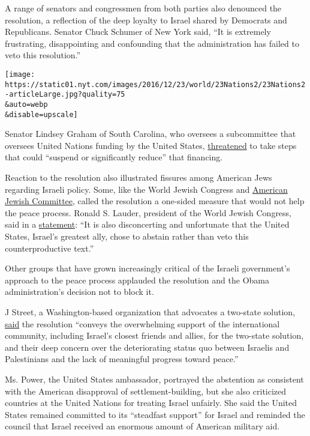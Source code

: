A range of senators and congressmen from both parties also denounced the
resolution, a reflection of the deep loyalty to Israel shared by
Democrats and Republicans. Senator Chuck Schumer of New York said, ``It
is extremely frustrating, disappointing and confounding that the
administration has failed to veto this resolution.''

\texttt{[image: https://static01.nyt.com/images/2016/12/23/world/23Nations2/23Nations2-articleLarge.jpg?quality=75\\\&auto=webp\\\&disable=upscale]}

Senator Lindsey Graham of South Carolina, who oversees a subcommittee
that oversees United Nations funding by the United States,
\href{http://www.lgraham.senate.gov/public/index.cfm/press-releases?ID=3D8C552F-EE98-4A25-942E-5B389F2695F2}{threatened}
to take steps that could ``suspend or significantly reduce'' that
financing.

Reaction to the resolution also illustrated fissures among American Jews
regarding Israeli policy. Some, like the World Jewish Congress and
\href{http://www.ajc.org/site/apps/nlnet/content3.aspx?c=7oJILSPwFfJSG\&b=9302337\&ct=14976765\&notoc=1}{American
Jewish Committee}, called the resolution a one-sided measure that would
not help the peace process. Ronald S. Lauder, president of the World
Jewish Congress, said in a
\href{http://www.worldjewishcongress.org/en/news/wjc-president-lauder-dismayed-by-un-security-council-resolution-on-israeli-settlements-calls-us-choice-not-to-veto-disconcerting-an-unfortunate-12-5-2016}{statement}:
``It is also disconcerting and unfortunate that the United States,
Israel's greatest ally, chose to abstain rather than veto this
counterproductive text.''

Other groups that have grown increasingly critical of the Israeli
government's approach to the peace process applauded the resolution and
the Obama administration's decision not to block it.

J Street, a Washington-based organization that advocates a two-state
solution,
\href{http://jstreet.org/press-releases/j-street-welcomes-us-abstention-unsc-resolution/\#.WF2d7X35PZw}{said}
the resolution ``conveys the overwhelming support of the international
community, including Israel's closest friends and allies, for the
two-state solution, and their deep concern over the deteriorating status
quo between Israelis and Palestinians and the lack of meaningful
progress toward peace.''

Ms. Power, the United States ambassador, portrayed the abstention as
consistent with the American disapproval of settlement-building, but she
also criticized countries at the United Nations for treating Israel
unfairly. She said the United States remained committed to its
``steadfast support'' for Israel and reminded the council that Israel
received an enormous amount of American military aid.

